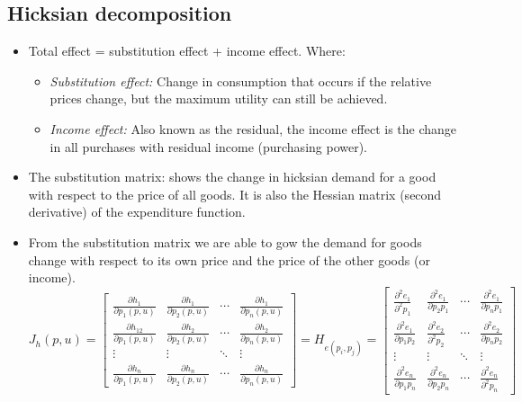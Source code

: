 \documentclass{article}
\begin{document}
\subsection{Hicksian decomposition}
\begin{itemize}
    \item Total effect = substitution effect + income effect. Where:
        \begin{itemize}
            \item \textit{Substitution effect:} Change in consumption that occurs if the relative prices change, but the maximum utility can still be achieved.
            \item \textit{Income effect:} Also known as the residual, the income effect is the change in all purchases with residual income (purchasing power). 
        \end{itemize}
    \item The substitution matrix: shows the change in hicksian demand for a good with respect to the price of all goods. It is also the Hessian matrix (second derivative) of the expenditure function.
    \item From the substitution matrix we are able to gow the demand for goods change with respect to its own price and the price of the other goods (or income).
        \[
        J_h{(p,u)} = 
        \begin{bmatrix}
        \frac{\partial h_1}{\partial p_1(p,u)} & \frac{\partial h_1}{\partial p_2(p,u)} & \cdots & \frac{\partial h_1}{\partial p_n(p,u)} \\
        \frac{\partial h_12}{\partial p_1(p,u)} & \frac{\partial h_2}{\partial p_2(p,u)}  & \cdots & \frac{\partial h_2}{\partial p_n(p,u)} \\
        \vdots & \vdots & \ddots & \vdots \\
        \frac{\partial h_n}{\partial p_1(p,u)} & \frac{\partial h_n}{\partial p_2(p,u)} & \cdots & \frac{ \partial h_n}{ \partial p_n(p,u)} 
        \end{bmatrix}
        = H_{e(p_i,p_j)} =
        \begin{bmatrix}
        \frac{\partial^2 e_1}{\partial^2p_1} & \frac{\partial^2 e_1}{\partial p_2p_1} & \cdots & \frac{\partial^2 e_1}{\partial p_np_1} \\
        \frac{\partial^2 e_1}{\partial p_1p_2} & \frac{\partial^2 e_2}{\partial^2 p_2}  & \cdots & \frac{\partial^2 e_2}{\partial p_np_2} \\
        \vdots & \vdots & \ddots & \vdots \\
        \frac{\partial^2 e_n}{\partial p_1p_n} & \frac{\partial^2 e_n}{\partial p_2p_n} & \cdots & \frac{ \partial^2 e_n}{ \partial^2 p_n} 
        \end{bmatrix}\label{submatrix_2}
        \]
\end{itemize}
\end{document}
